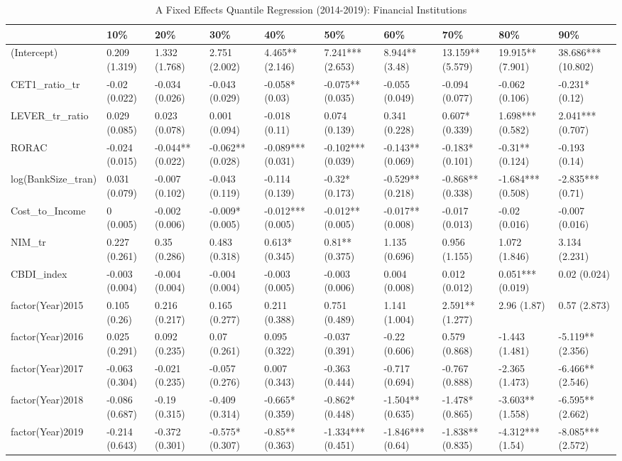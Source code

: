 \begin{table}[ht]
\centering
\caption{A Fixed Effects Quantile Regression (2014-2019): Financial Institutions} 
\begingroup\small
\begin{tabular}{llllllllll}
  \toprule
 & 10\% & 20\% & 30\% & 40\% & 50\% & 60\% & 70\% & 80\% & 90\% \\ 
  \midrule
(Intercept) & 0.209 (1.319) & 1.332 (1.768) & 2.751 (2.002) & 4.465** (2.146) & 7.241*** (2.653) & 8.944** (3.48) & 13.159** (5.579) & 19.915** (7.901) & 38.686*** (10.802) \\ 
  CET1\_ratio\_tr & -0.02 (0.022) & -0.034 (0.026) & -0.043 (0.029) & -0.058* (0.03) & -0.075** (0.035) & -0.055 (0.049) & -0.094 (0.077) & -0.062 (0.106) & -0.231* (0.12) \\ 
  LEVER\_tr\_ratio & 0.029 (0.085) & 0.023 (0.078) & 0.001 (0.094) & -0.018 (0.11) & 0.074 (0.139) & 0.341 (0.228) & 0.607* (0.339) & 1.698*** (0.582) & 2.041*** (0.707) \\ 
  RORAC & -0.024 (0.015) & -0.044** (0.022) & -0.062** (0.028) & -0.089*** (0.031) & -0.102*** (0.039) & -0.143** (0.069) & -0.183* (0.101) & -0.31** (0.124) & -0.193 (0.14) \\ 
  log(BankSize\_tran) & 0.031 (0.079) & -0.007 (0.102) & -0.043 (0.119) & -0.114 (0.139) & -0.32* (0.173) & -0.529** (0.218) & -0.868** (0.338) & -1.684*** (0.508) & -2.835*** (0.71) \\ 
  Cost\_to\_Income & 0 (0.005) & -0.002 (0.006) & -0.009* (0.005) & -0.012*** (0.005) & -0.012** (0.005) & -0.017** (0.008) & -0.017 (0.013) & -0.02 (0.016) & -0.007 (0.016) \\ 
  NIM\_tr & 0.227 (0.261) & 0.35 (0.286) & 0.483 (0.318) & 0.613* (0.345) & 0.81** (0.375) & 1.135 (0.696) & 0.956 (1.155) & 1.072 (1.846) & 3.134 (2.231) \\ 
  CBDI\_index & -0.003 (0.004) & -0.004 (0.004) & -0.004 (0.004) & -0.003 (0.005) & -0.003 (0.006) & 0.004 (0.008) & 0.012 (0.012) & 0.051*** (0.019) & 0.02 (0.024) \\ 
  factor(Year)2015 & 0.105 (0.26) & 0.216 (0.217) & 0.165 (0.277) & 0.211 (0.388) & 0.751 (0.489) & 1.141 (1.004) & 2.591** (1.277) & 2.96 (1.87) & 0.57 (2.873) \\ 
  factor(Year)2016 & 0.025 (0.291) & 0.092 (0.235) & 0.07 (0.261) & 0.095 (0.322) & -0.037 (0.391) & -0.22 (0.606) & 0.579 (0.868) & -1.443 (1.481) & -5.119** (2.356) \\ 
  factor(Year)2017 & -0.063 (0.304) & -0.021 (0.235) & -0.057 (0.276) & 0.007 (0.343) & -0.363 (0.444) & -0.717 (0.694) & -0.767 (0.888) & -2.365 (1.473) & -6.466** (2.546) \\ 
  factor(Year)2018 & -0.086 (0.687) & -0.19 (0.315) & -0.409 (0.314) & -0.665* (0.359) & -0.862* (0.448) & -1.504** (0.635) & -1.478* (0.865) & -3.603** (1.558) & -6.595** (2.662) \\ 
  factor(Year)2019 & -0.214 (0.643) & -0.372 (0.301) & -0.575* (0.307) & -0.85** (0.363) & -1.334*** (0.451) & -1.846*** (0.64) & -1.838** (0.835) & -4.312*** (1.54) & -8.085*** (2.572) \\ 
   \bottomrule
\end{tabular}
\endgroup
\end{table}
